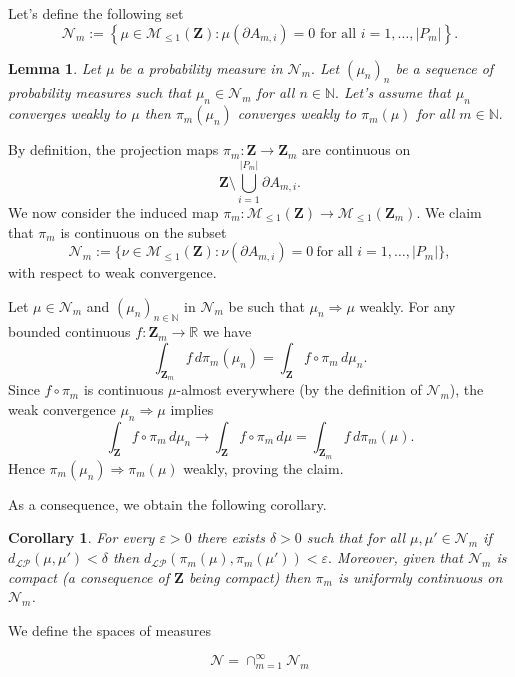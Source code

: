 \documentclass[12pt,twoside,a4paper]{article}
\newtheorem{corollary}{Corollary}[theorem]
\newtheorem{lemma}[theorem]{Lemma}
\newcommand{\Space}{\mathbf{Z}}
\begin{document}
Let's define the following set
\begin{equation}
\mathcal{N}_m := \left\{ \mu \in \mathcal{M}_{\leq 1}(\Space) : \mu(\partial A_{m,i}) = 0 \text{ for all } i = 1, \dots, |P_m| \right\}.
\end{equation}
\begin{lemma}
Let $\mu$ be a probability measure in $\mathcal{N}_m.$ Let $(\mu_n)_n$ be a sequence of probability measures such that $\mu_n\in \mathcal{N}_m$ for all $n\in \mathbb{N}.$ Let's assume that $\mu_n$ converges weakly to $\mu$ then $\pi_m(\mu_n)$ converges weakly to $\pi_m(\mu)$ for all $m\in \mathbb{N}.$
\end{lemma}
\proof
By definition, the projection maps $\pi_m : \Space \to \Space_m$ are continuous on 
\[
\Space \setminus \bigcup_{i=1}^{|P_m|} \partial A_{m,i}.
\]
We now consider the induced map $\pi_m : \mathcal{M}_{\leq 1}(\Space) \to \mathcal{M}_{\leq 1}(\Space_m)$. We claim that $\pi_m$ is continuous on the subset
\[
\mathcal{N}_m := \bigl\{ \nu \in \mathcal{M}_{\leq 1}(\Space) : \nu(\partial A_{m,i}) = 0 \ \text{for all } i=1,\dots, |P_m| \bigr\},
\]
with respect to weak convergence.  

Let $\mu \in \mathcal{N}_m$ and $(\mu_n)_{n\in\mathbb{N}}$ in $\mathcal{N}_m$ be such that $\mu_n \Rightarrow \mu$ weakly. For any bounded continuous $f : \Space_m \to \mathbb{R}$ we have
\[
\int_{\Space_m} f \, d\pi_m(\mu_n) 
= \int_{\Space} f \circ \pi_m \, d\mu_n.
\]
Since $f \circ \pi_m$ is continuous $\mu$-almost everywhere (by the definition of $\mathcal{N}_m$), the weak convergence $\mu_n \Rightarrow \mu$ implies
\[
\int_{\Space} f \circ \pi_m \, d\mu_n \longrightarrow \int_{\Space} f \circ \pi_m \, d\mu 
= \int_{\Space_m} f \, d\pi_m(\mu).
\]
Hence $\pi_m(\mu_n) \Rightarrow \pi_m(\mu)$ weakly, proving the claim.
\endproof

As a consequence, we obtain the following corollary.

\begin{corollary}\label{cor:ineqLevyProkPim}
 For every $\varepsilon>0$ there exists $\delta>0$ such that for all $\mu,\mu'\in \mathcal{N}_m$ if $d_{\mathcal{LP}}(\mu,\mu')<\delta$ then $d_{\mathcal{LP}}(\pi_m(\mu),\pi_m(\mu'))<\varepsilon.$ Moreover, given that $\mathcal{N}_m$ is compact (a consequence of $\Space$ being compact) then $\pi_m$ is uniformly continuous on $\mathcal{N}_m$.
\end{corollary}

We define the spaces of measures

\begin{equation}
    \mathcal{N}=\cap^{\infty}_{m=1}\mathcal{N}_m
\end{equation}
\end{document}
